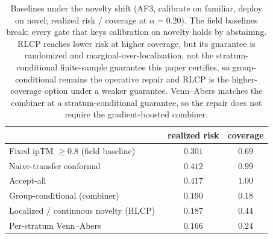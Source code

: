 \documentclass[10pt]{article}
\begin{document}
\begin{table}[t]
\centering\small
\caption{Baselines under the novelty shift (AF3, calibrate on familiar, deploy on novel; realized risk /
coverage at $\alpha=0.20$). The field baselines break; every gate that keys calibration on novelty holds by
abstaining. RLCP reaches lower risk at higher coverage, but its guarantee is randomized and
marginal-over-localization, not the stratum-conditional finite-sample guarantee this paper certifies, so
group-conditional remains the operative repair and RLCP is the higher-coverage option under a weaker
guarantee. Venn--Abers matches the combiner at a stratum-conditional guarantee, so the repair does not
require the gradient-boosted combiner.}
\label{tab:baselines}
\begin{tabular}{lcc}
\toprule
 & realized risk & coverage \\
\midrule
Fixed ipTM $\ge 0.8$ (field baseline) & $0.301$ & $0.69$ \\
Naive-transfer conformal & $0.412$ & $0.99$ \\
Accept-all & $0.417$ & $1.00$ \\
\midrule
Group-conditional (combiner) & $\mathbf{0.190}$ & $0.18$ \\
Localized / continuous novelty (RLCP)~\citep{hore2024rlcp} & $\mathbf{0.187}$ & $0.44$ \\
Per-stratum Venn--Abers~\citep{vovk2014vennabers} & $\mathbf{0.166}$ & $0.24$ \\
\bottomrule
\end{tabular}
\end{table}
\end{document}
